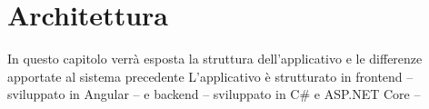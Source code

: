\chapter{Architettura}
In questo capitolo verrà esposta la struttura dell'applicativo e le differenze apportate al sistema precedente 
L'applicativo è strutturato in frontend -- sviluppato in Angular -- e backend -- sviluppato in C\# e ASP.NET Core -- 